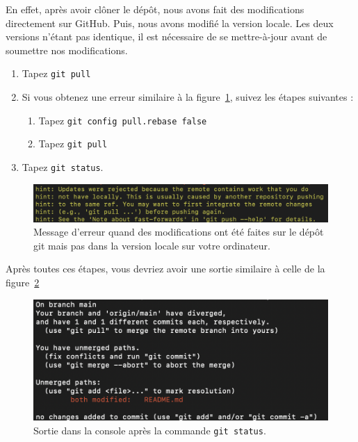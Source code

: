 \documentclass{book}
\newenvironment{myexampleblock}[1]{%
    \tcolorbox[beamer,%
    noparskip,breakable,
    colback=LightGreen,colframe=DarkGreen,%
    colbacklower=LimeGreen!75!LightGreen,%
    title={#1}, width=\textwidth]}%
    {\endtcolorbox}
\begin{document}
En effet, après avoir clôner le dépôt, nous avons fait des modifications directement sur GitHub. Puis, nous avons modifié la version locale. Les deux versions n'étant pas identique, il est nécessaire de se mettre-à-jour avant de soumettre nos modifications.

\begin{myexampleblock}{Exercice : Gérer manuellement la fusion}
    \begin{enumerate}
        \item Tapez \texttt{git pull}
        \item Si vous obtenez une erreur similaire à la figure~\ref{fig:erreur_pull_git}, suivez les étapes suivantes :
        \begin{enumerate}
            \item Tapez \texttt{git config pull.rebase false}
            \item Tapez \texttt{git pull}
        \end{enumerate}
        \item Tapez \texttt{git status}.
    \end{enumerate}
\end{myexampleblock}

\begin{figure}[!h]
    \centering
    \includegraphics[width=\textwidth]{images/erreur_push_git.png}
    \caption{Message d'erreur quand des modifications ont été faites sur le dépôt git mais pas dans la version locale sur votre ordinateur.}\label{fig:erreur_pull_git}
\end{figure}

Après toutes ces étapes, vous devriez avoir une sortie similaire à celle de la figure~\ref{fig:git_status}

\begin{figure}[!h]
    \centering
    \includegraphics[width=\textwidth]{images/git_status.png}
    \caption{Sortie dans la console après la commande \texttt{git status}.}\label{fig:git_status}
\end{figure}
\end{document}
